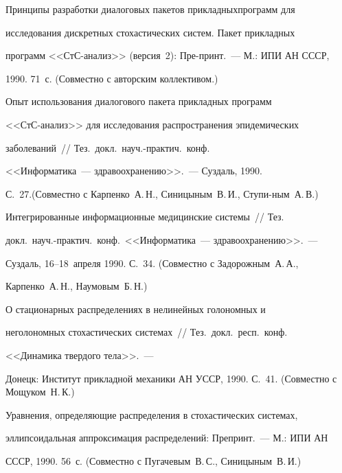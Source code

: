 Принципы разработки диалоговых пакетов прикладных\linebreak прог\-рамм для


исследования дискретных стохастических систем. Пакет прикладных


программ <<СтС-анализ>> (версия~2): Пре-\linebreak принт.~--- М.: ИПИ АН СССР,


1990. 71~с. (Совместно с авторским коллективом.)





 Опыт использования диалогового пакета прикладных программ


 <<СтС-ана\-лиз>> для исследования распространения эпидемических


заболеваний~// Тез.\ докл.\ науч.-практич.\ конф.\


 <<Информатика~--- здравоохранению>>.~--- Суздаль, 1990.


С.~27.\linebreak (Совместно с Карпенко~А.\,Н., Синицыным~В.\,И., Ступи-\linebreak ным~А.\,В.)





 Интегрированные информационные медицинские системы~// Тез.\


докл.\ науч.-практич.\ конф.\ <<Информатика~--- здравоохранению>>.~---


Суздаль, 16--18~апреля 1990. С.~34. (Совместно с Задорожным~А.\,А.,


Карпенко~А.\,Н., Наумовым~Б.\,Н.)





 О стационарных распределениях в нелинейных голономных и


неголономных стохастических системах~// Тез.\ докл.\ респ.\ конф.\


<<Динамика твердого тела>>.~---


Донецк: Институт прикладной механики АН УССР, 1990. С.~41. (Совместно с Мощуком~Н.\,К.)





 Уравнения, определяющие распределения в стохастических сис\-те\-мах,


эллипсоидальная аппроксимация распределений: Препринт.~--- М.: ИПИ АН


СССР, 1990. 56~с. (Совместно с Пугачевым~В.\,С., Синицыным~В.\,И.)





